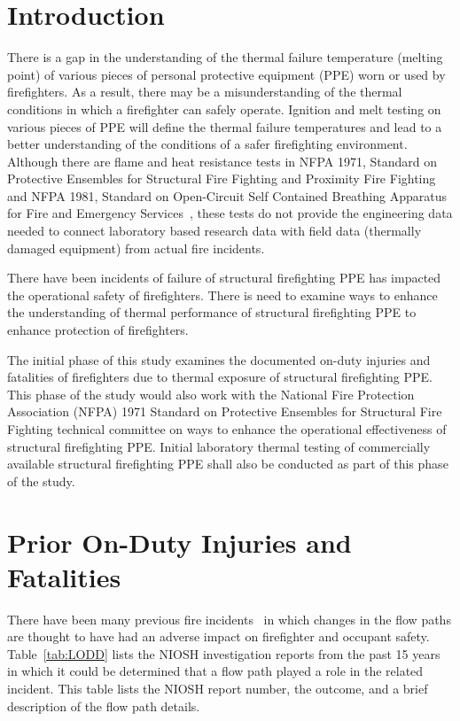 \documentclass[12pt,oneside]{book}
\begin{document}
\chapter{Introduction}
\setcounter{page}{1}
There is a gap in the understanding of the thermal failure temperature (melting point) of various pieces of personal protective equipment (PPE) worn or used by firefighters. As a result, there may be a misunderstanding of the thermal conditions in which a firefighter can safely operate. Ignition and melt testing on various pieces of PPE will define the thermal failure temperatures and lead to a better understanding of the conditions of a safer firefighting environment. Although there are flame and heat resistance tests in NFPA 1971, Standard on Protective Ensembles for Structural Fire Fighting and Proximity Fire Fighting~\cite{nfpa1971_2013} and NFPA 1981, Standard on Open-Circuit Self Contained Breathing Apparatus for Fire and Emergency Services~\cite{nfpa1981_2013}, these tests do not provide the engineering data needed to connect laboratory based research data with field data (thermally damaged equipment) from actual fire incidents.

There have been incidents of failure of structural firefighting PPE has impacted the operational safety of firefighters. There is need to examine ways to enhance the understanding of thermal performance of structural firefighting PPE to enhance protection of firefighters.

The initial phase of this study examines the documented on-duty injuries and fatalities of firefighters due to thermal exposure of structural firefighting PPE. This phase of the study would also work with the National Fire Protection Association (NFPA) 1971 Standard on Protective Ensembles for Structural Fire Fighting technical committee on ways to enhance the operational effectiveness of structural firefighting PPE. Initial laboratory thermal testing of commercially available structural firefighting PPE shall also be conducted as part of this phase of the study.

\chapter{Prior On-Duty Injuries and Fatalities}

There have been many previous fire incidents~\cite{NIOSH:Pettit,NIOSH:Washenitz,NIOSH:Mezzanotte,NIOSH:McFall,NIOSH:McFall2,NIOSH:McFall3,NIOSH:Berardinelli,NIOSH:Koedam,NIOSH:McFall4,NIOSH:Tarley,NIOSH:Braddee,NIOSH:Merinar,NIOSH:Bowyer2,NIOSH:Loflin,NIOSH:Bowyer} in which changes in the flow paths are thought to have had an adverse impact on firefighter and occupant safety. Table~\ref{tab:LODD} lists the NIOSH investigation reports from the past 15 years in which it could be determined that a flow path played a role in the related incident. This table lists the NIOSH report number, the outcome, and a brief description of the flow path details.
\end{document}
